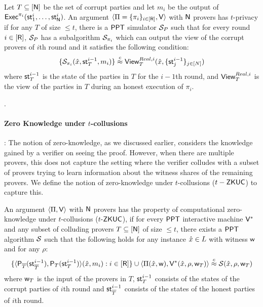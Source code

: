 \begin{definition}
Let $T\subseteq [\mathsf{N}]$ be the set of corrupt parties and let $m_i$ be the output of $\mathsf{Exec}^{\pi_i}(\mathsf{st}^i_1, \ldots, \mathsf{st}^i_{\mathsf{N}})$. An argument $\langle \Pi = \{\pi_i\}_{i \in [\mathsf{R}]},\mathsf{V}\rangle$ with $\mathsf{N}$ provers has $t$-privacy if for any $T$ of size $\leq t$, there is a $\mathsf{PPT}$ simulator $\mathcal{S}_{P}$ such that for every round $i \in [\mathsf{R}]$, $\mathcal{S}_{P}$ has a subalgorithm  $\mathcal{S}_{\pi_i}$ which can output the view of the corrupt provers of  $i$th round and it satisfies the following condition: 
\[
 \{ \mathcal{S}_{\pi_i} (\hat{x}, \mathsf{st}^{i-1}_T, m_i) \} \stackrel{c}{\approx}  \mathsf{View}^{Real, i}_T ( \hat{x}, \{\mathsf{st}^{i-1}_j\}_{j \in [N]}) 
\]
where $\mathsf{st}^{i-1}_T$ is the state of the parties in $T$ for the $i-1$th round, and $\mathsf{View}^{Real, i}_T$ is the view of the parties in $T$ during an honest execution of $\pi_i$.
\end{definition}
.

\paragraph{Zero Knowledge under $t$-collusions}: 
The notion of zero-knowledge, as we discussed earlier, considers the knowledge gained by a verifier on seeing the proof. However, when there are multiple provers, this does not capture the setting where the verifier colludes with a subset of provers trying to learn information about the witness shares of the remaining provers. We define the notion of zero-knowledge under $t$-collusions ($t-\mathsf{ZKUC}$) to capture this.

\begin{definition}
An argument $\langle \Pi,\mathsf{V}\rangle$ with $\mathsf{N}$ provers has the property of computational zero-knowledge under $t$-collusions ($t$-$\mathsf{ZKUC}$), if for every $\mathsf{PPT}$ interactive machine $\mathsf{V}^*$ and any subset of colluding provers $T\subseteq [\mathsf{N}]$ of size $\leq t$, there exists a $\mathsf{PPT}$ algorithm $\mathcal{S}$ such that the following holds for any instance $\hat{x} \in L$ with witness $\mathsf{w}$ and for any $\rho$: 
\[
 \{ \langle  \mathsf{P}_{\overline{T}}( \mathsf{st}^{i-1}_{\overline{T}} ) , \mathsf{P}_T ( \mathsf{st}^{i-1}_T ) \rangle ( \hat{x}  , m_i): i\in [\mathsf{R}] \} \cup \langle \Pi(\hat{x}, \mathsf{w}),\mathsf{V}^*(\hat{x}, \rho, \mathsf{w}_T)\rangle  \stackrel{c}{\approx}  \mathcal{S} (\hat{x}, \rho, \mathsf{w}_T)
\]
where $\mathsf{w}_T$ is the input of the provers in $T$, $\mathsf{st}^{i-1}_T$ consists of the states of the corrupt parties of $i$th round and $\mathsf{st}^{i-1}_{\overline{T}}$ consists of the states of the honest parties of $i$th round. 

\end{definition}

